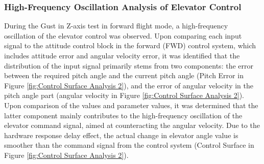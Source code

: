 \subsubsection{High-Frequency Oscillation Analysis of Elevator Control}

During the Gust in Z-axis test in forward flight mode, a high-frequency oscillation of the elevator control was observed. Upon comparing each input signal to the attitude control block in the forward (FWD) control system, which includes attitude error and angular velocity error, it was identified that the distribution of the input signal primarily stems from two components: the error between the required pitch angle and the current pitch angle (Pitch Error in Figure \ref{fig:Control Surface Analysis 2}), and the error of angular velocity in the pitch angle part (angular velocity in Figure \ref{fig:Control Surface Analysis 2}). Upon comparison of the values and parameter values, it was determined that the latter component mainly contributes to the high-frequency oscillation of the elevator command signal, aimed at counteracting the angular velocity. Due to the hardware response delay effect, the actual change in elevator angle value is smoother than the command signal from the control system (Control Surface in Figure \ref{fig:Control Surface Analysis 2}).

